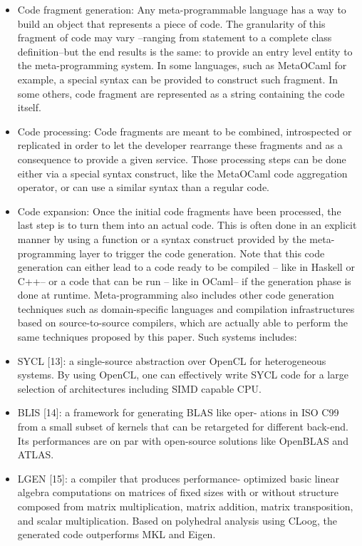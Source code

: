 \documentclass[../../main.tex]{subfiles}
\begin{document}
\begin{itemize}
\item Code fragment generation: Any meta-programmable
language has a way to build an object that represents a
piece of code. The granularity of this fragment of code
may vary –ranging from statement to a complete class
definition–but the end results is the same: to provide
an entry level entity to the meta-programming system.
In some languages, such as MetaOCaml for example,
a special syntax can be provided to construct such
fragment. In some others, code fragment are represented
as a string containing the code itself.

\item Code processing: Code fragments are meant to
be combined, introspected or replicated in order to
let the developer rearrange these fragments and as a
consequence to provide a given service. Those processing
steps can be done either via a special syntax construct,
like the MetaOCaml code aggregation operator, or can
use a similar syntax than a regular code.

\item Code expansion: Once the initial code fragments have
been processed, the last step is to turn them into an
actual code. This is often done in an explicit manner by
using a function or a syntax construct provided by the
meta-programming layer to trigger the code generation.
Note that this code generation can either lead to a code
ready to be compiled – like in Haskell or C++– or a
code that can be run – like in OCaml– if the generation
phase is done at runtime.
Meta-programming also includes other code generation
techniques such as domain-specific languages and compilation
infrastructures based on source-to-source compilers, which
are actually able to perform the same techniques proposed by
this paper. Such systems includes:

\item SYCL [13]: a single-source abstraction over OpenCL
for heterogeneous systems. By using OpenCL, one can
effectively write SYCL code for a large selection of
architectures including SIMD capable CPU.

\item BLIS [14]: a framework for generating BLAS like oper-
ations in ISO C99 from a small subset of kernels that can
be retargeted for different back-end. Its performances are
on par with open-source solutions like OpenBLAS and
ATLAS.

\item LGEN [15]: a compiler that produces performance-
optimized basic linear algebra computations on matrices
of fixed sizes with or without structure composed
from matrix multiplication, matrix addition, matrix
transposition, and scalar multiplication. Based on
polyhedral analysis using CLoog, the generated code
outperforms MKL and Eigen.
\end{itemize}
\end{document}
